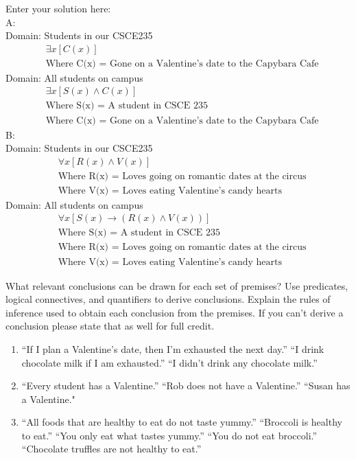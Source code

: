 \documentclass[10pt]{exam}
\begin{document}
\begin{questions}
\begin{solution}
    Enter your solution here: \\
    A: \\
    Domain: Students in our CSCE235 
     \begin{align*}
        &\exists x \left[ C(x) \right] \\
        &\text{Where C(x) = Gone on a Valentine’s date to the Capybara Cafe}
     \end{align*}
    Domain: All students on campus 
    \begin{align*}
         &\exists x \left[ S(x) \land C(x) \right] \\
         &\text{Where S(x) = A student in CSCE 235} \\
         &\text{Where C(x) = Gone on a Valentine’s date to the Capybara Cafe}
     \end{align*}
    \vspace{.1cm}
    B: \\
    Domain: Students in our CSCE235
    \begin{align*}
         &\forall x \left[ R(x) \land V(x) \right] \\
         &\text{Where R(x) = Loves going on romantic dates at the circus} \\
         &\text{Where V(x) = Loves eating Valentine’s candy hearts}
     \end{align*}
    Domain: All students on campus
    \begin{align*}
         &\forall x \left[ S(x) \rightarrow (R(x) \land V(x)) \right] \\
         &\text{Where S(x) = A student in CSCE 235} \\
         &\text{Where R(x) = Loves going on romantic dates at the circus} \\
         &\text{Where V(x) = Loves eating Valentine’s candy hearts}
     \end{align*}
\end{solution}

\question[15] What relevant conclusions can be drawn for each set of premises? Use predicates, logical connectives, and quantifiers to derive conclusions. Explain the rules of inference used to obtain each conclusion from the premises. If you can't derive a conclusion please state that as well for full credit.

\begin{enumerate} [label=(\alph*)]
  \item  “If I plan a Valentine’s date, then I’m exhausted the next day.” “I drink chocolate milk if I am exhausted.” “I didn’t drink any chocolate milk.”
  \item ``Every student has a Valentine.” “Rob does not have a Valentine.” “Susan has a Valentine."
  \item ``All foods that are healthy to eat do not taste yummy.” “Broccoli is healthy to eat.” “You only eat what tastes yummy.” “You do not eat broccoli.” “Chocolate truffles are not healthy to eat.''
\end{enumerate}


\end{questions}
\end{document}
